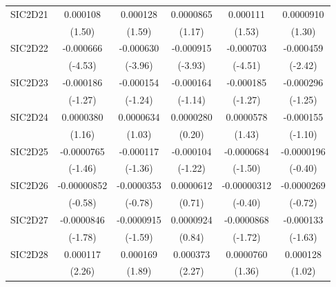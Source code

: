 \begin{table}[htbp]
\begin{tabular}{l*{5}{c}}
SIC2D21     &    0.000108         &    0.000128         &   0.0000865         &    0.000111         &   0.0000910         \\
            &      (1.50)         &      (1.59)         &      (1.17)         &      (1.53)         &      (1.30)         \\
SIC2D22     &   -0.000666\sym{***}&   -0.000630\sym{***}&   -0.000915\sym{***}&   -0.000703\sym{***}&   -0.000459\sym{*}  \\
            &     (-4.53)         &     (-3.96)         &     (-3.93)         &     (-4.51)         &     (-2.42)         \\
SIC2D23     &   -0.000186         &   -0.000154         &   -0.000164         &   -0.000185         &   -0.000296         \\
            &     (-1.27)         &     (-1.24)         &     (-1.14)         &     (-1.27)         &     (-1.25)         \\
SIC2D24     &   0.0000380         &   0.0000634         &   0.0000280         &   0.0000578         &   -0.000155         \\
            &      (1.16)         &      (1.03)         &      (0.20)         &      (1.43)         &     (-1.10)         \\
SIC2D25     &  -0.0000765         &   -0.000117         &   -0.000104         &  -0.0000684         &  -0.0000196         \\
            &     (-1.46)         &     (-1.36)         &     (-1.22)         &     (-1.50)         &     (-0.40)         \\
SIC2D26     & -0.00000852         &  -0.0000353         &   0.0000612         & -0.00000312         &  -0.0000269         \\
            &     (-0.58)         &     (-0.78)         &      (0.71)         &     (-0.40)         &     (-0.72)         \\
SIC2D27     &  -0.0000846         &  -0.0000915         &   0.0000924         &  -0.0000868         &   -0.000133         \\
            &     (-1.78)         &     (-1.59)         &      (0.84)         &     (-1.72)         &     (-1.63)         \\
SIC2D28     &    0.000117\sym{*}  &    0.000169         &    0.000373\sym{*}  &   0.0000760         &    0.000128         \\
            &      (2.26)         &      (1.89)         &      (2.27)         &      (1.36)         &      (1.02)         \\

\end{tabular}
\end{table}
